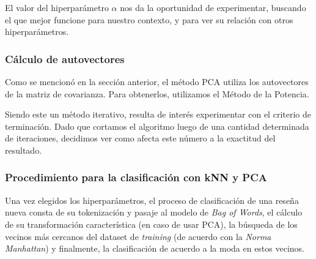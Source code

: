 El valor del hiperparámetro $\alpha$ nos da la oportunidad de experimentar,
buscando el que mejor funcione para nuestro contexto, y para ver su relación
con otros hiperparámetros.

%
%

\subsubsection{Cálculo de autovectores}
Como se mencionó en la sección anterior, el método PCA utiliza los autovectores de la matriz de covarianza.
Para obtenerlos, utilizamos el Método de la Potencia\cite{pot}.

Siendo este un método iterativo, resulta de interés experimentar con el criterio de terminación.
Dado que cortamos el algoritmo luego de una cantidad determinada de iteraciones,
decidimos ver como afecta este número a la exactitud del resultado.

\subsubsection{Procedimiento para la clasificación con kNN y PCA}
Una vez elegidos los hiperparámetros, el proceso de clasificación de una reseña
nueva consta de su tokenización y pasaje al modelo de \textit{Bag of Words},
el cálculo de su transformación característica (en caso de usar PCA),
la búsqueda de los vecinos más cercanos del dataset de \textit{training}
(de acuerdo con la \textit{Norma Manhattan}) y finalmente,
la clasificación de acuerdo a la moda en estos vecinos.

